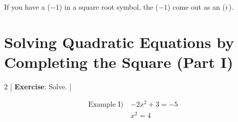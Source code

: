 If you have a ($-1$) in a square root symbol, the ($-1$) come out as an (${i\mkern1mu}$).

\section{Solving Quadratic Equations by Completing the Square (Part I)}

\begin{multicols}{2}
[
  \textbf{Exercise}: Solve.
]

\begin{align*}
  \text{Example I)}\ &-2x^{2}+3=-5\\
  &x^{2}=4\\
\end{align*}
\end{multicols}
